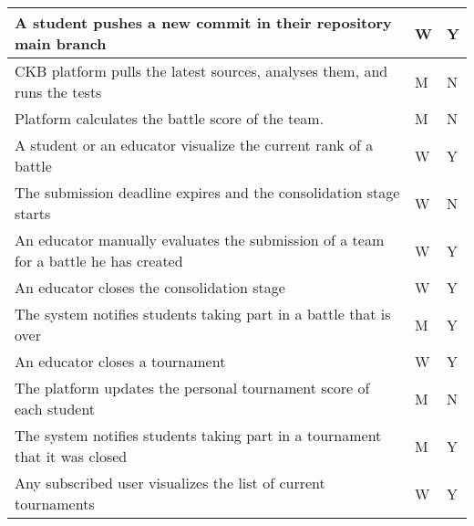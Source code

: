 \begin{center}
\begin{longtable}{|p{8.7cm}|p{3cm}|p{3cm}|}
        A student pushes a new commit in their repository main branch                                                                         & W                      & Y               \\ \hline
        CKB platform pulls the latest sources, analyses them, and runs the tests                                                              & M                      & N               \\ \hline
        Platform calculates the battle score of the team.                                                                                     & M                      & N               \\ \hline
        A student or an educator visualize the current rank of a battle                                                                       & W                      & Y               \\ \hline
        The submission deadline expires and the consolidation stage starts                                                                    & W                      & N               \\ \hline
        An educator manually evaluates the submission of a team for a battle he has created                                                   & W                      & Y               \\ \hline
        An educator closes the consolidation stage                                                                                            & W                      & Y               \\ \hline
        The system notifies students taking part in a battle that is over                                                                     & M                      & Y               \\ \hline
        An educator closes a tournament                                                                                                       & W                      & Y               \\ \hline
        The platform updates the personal tournament score of each student                                                                    & M                      & N               \\ \hline
        The system notifies students taking part in a tournament that it was closed                                                           & M                      & Y               \\ \hline
        Any subscribed user visualizes the list of current tournaments                                                                        & W                      & Y               \\ \hline

\end{longtable}
\end{center}
